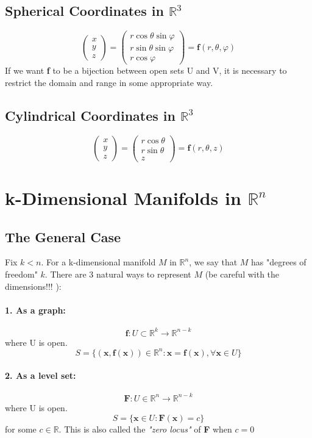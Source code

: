 \documentclass[11pt]{article}
\newcommand{\ti}[1]{\textit{#1}}
\newcommand{\tb}[1]{\textbf{#1}}
\newcommand{\real}[0]{\mathbb{R}}
\newcommand{\func}[3]{\tb{#1}: {#2} \rightarrow {#3} }
\begin{document}
\subsection{Spherical Coordinates in $\real^3$}
$$\begin{pmatrix}
	x\\y\\z
\end{pmatrix}
= \begin{pmatrix}
	r\cos{\theta}\sin{\varphi}\\
	r\sin{\theta}\sin{\varphi}\\
	r\cos{\varphi}
\end{pmatrix}
= \tb{f}(r, \theta, \varphi)$$
If we want \tb{f} to be a bijection between open sets U and V, it is necessary to restrict the domain and range in some appropriate way.

\subsection{Cylindrical Coordinates in $\real^3$}
$$\begin{pmatrix}
	x\\y\\z
\end{pmatrix}
= \begin{pmatrix}
	r\cos{\theta}\\
	r\sin{\theta}\\
	z
\end{pmatrix}
= \tb{f}(r, \theta, z)$$

\section{k-Dimensional Manifolds in $\real^n$}
\subsection{The General Case}
Fix $k < n$. For a k-dimensional manifold $M$ in $\real^n$, we say that $M$ has "degrees of freedom" $k$. There are 3 natural ways to represent $M$ (be careful with the dimensions!!! ):
\paragraph{1. As a \tb{graph}:}
		$$\func{f}{U \subset \real^k}{\real^{n-k}}$$ where U is open.
		$$ S = \{(\tb{x}, \tb{f}(\tb{x})) \in \real^n: \tb{x} = \tb{f}(\tb{x}), \forall \tb{x} \in U \}$$
\paragraph{2. As a \tb{level set}:}
	$$ \func{F}{U\in \real^n}{\real^{n-k}}$$ where U is open.
	$$ S = \{\tb{x} \in U: \tb{F}(\tb{x}) = c\}$$ for some $c \in \real$.\newline
	This is also called the \ti{"zero locus"} of \tb{F} when $c = 0$
\end{document}
